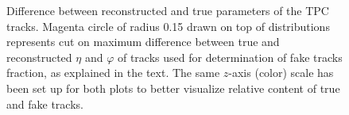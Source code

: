 \begin{figure}%
\centering
\parbox{0.4725\textwidth}{
  \centering
  \begin{subfigure}[b]{\linewidth}{
                }
  \end{subfigure}
}
\quad
\parbox{0.4725\textwidth}{
  \centering
  \begin{subfigure}[b]{\linewidth}{
                }
  \end{subfigure}
}%
\caption[Difference between reconstructed and true parameters of the TPC tracks.]{Difference between reconstructed and true parameters of the TPC tracks. Magenta circle of radius 0.15 drawn on top of distributions represents cut on maximum difference between true and reconstructed $\eta$ and $\varphi$ of tracks used for determination of fake tracks fraction, as explained in the text. The same $z$-axis (color) scale has been set up for both plots to better visualize relative content of true and fake tracks.} \label{fig:DeltaPhiVsDeltaEta}
\end{figure}


